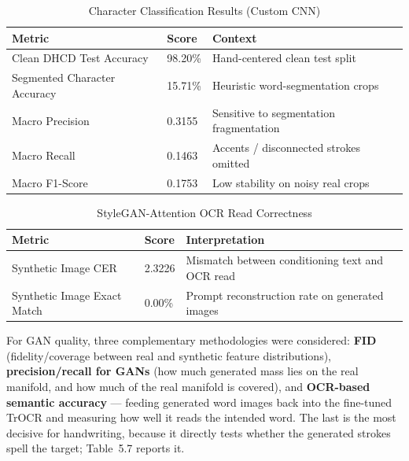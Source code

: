 \documentclass[12pt,a4paper]{report}
\begin{document}
\begin{table}[htbp]
\centering
\caption{Character Classification Results (Custom CNN)}
\small
\begin{tabular}{p{5cm}p{2.2cm}p{5.8cm}}
\toprule
\textbf{Metric} & \textbf{Score} & \textbf{Context} \\
\midrule
Clean DHCD Test Accuracy & 98.20\% & Hand-centered clean test split \\
Segmented Character Accuracy & 15.71\% & Heuristic word-segmentation crops \\
Macro Precision & 0.3155 & Sensitive to segmentation fragmentation \\
Macro Recall & 0.1463 & Accents / disconnected strokes omitted \\
Macro F1-Score & 0.1753 & Low stability on noisy real crops \\
\bottomrule
\end{tabular}
\end{table}

\begin{table}[htbp]
\centering
\caption{StyleGAN-Attention OCR Read Correctness}
\small
\begin{tabular}{p{5cm}p{2.2cm}p{5.8cm}}
\toprule
\textbf{Metric} & \textbf{Score} & \textbf{Interpretation} \\
\midrule
Synthetic Image CER & 2.3226 & Mismatch between conditioning text and OCR read \\
Synthetic Image Exact Match & 0.00\% & Prompt reconstruction rate on generated images \\
\bottomrule
\end{tabular}
\end{table}

For GAN quality, three complementary methodologies were considered: \textbf{FID} (fidelity/coverage between real and synthetic feature distributions), \textbf{precision/recall for GANs} (how much generated mass lies on the real manifold, and how much of the real manifold is covered), and \textbf{OCR-based semantic accuracy} --- feeding generated word images back into the fine-tuned TrOCR and measuring how well it reads the intended word. The last is the most decisive for handwriting, because it directly tests whether the generated strokes spell the target; Table~5.7 reports it.
\end{document}
